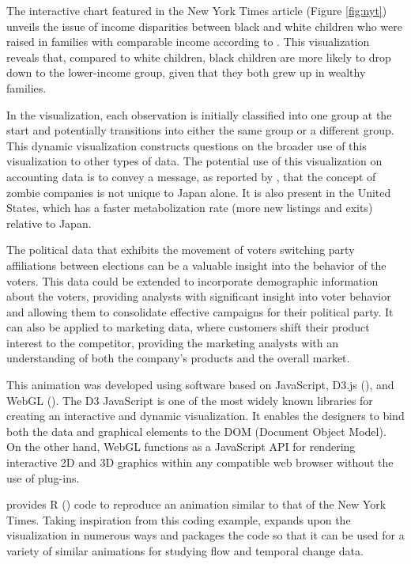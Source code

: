 The interactive chart featured in the New York Times article (Figure \ref{fig:nyt}) unveils the issue of income disparities between black and white children who were raised in families with comparable income according to \citet{race}. This visualization reveals that, compared to white children, black children are more likely to drop down to the lower-income group, given that they both grew up in wealthy families.

In the visualization, each observation is initially classified into one group at the start and potentially transitions into either the same group or a different group. This dynamic visualization constructs questions on the broader use of this visualization to other types of data. The potential use of this visualization on accounting data is to convey a message, as reported by \citet{oecd_report}, that the concept of zombie companies is not unique to Japan alone. It is also present in the United States, which has a faster metabolization rate (more new listings and exits) relative to Japan.

The political data that exhibits the movement of voters switching party affiliations between elections can be a valuable insight into the behavior of the voters. This data could be extended to incorporate demographic information about the voters, providing analysts with significant insight into voter behavior and allowing them to consolidate effective campaigns for their political party. It can also be applied to marketing data, where customers shift their product interest to the competitor, providing the marketing analysts with an understanding of both the company's products and the overall market.

This animation was developed using software based on JavaScript, D3.js (\citet{d3js}), and WebGL (\citet{webgl}). The D3 JavaScript is one of the most widely known libraries for creating an interactive and dynamic visualization. It enables the designers to bind both the data and graphical elements to the DOM (Document Object Model). On the other hand, WebGL functions as a JavaScript API for rendering interactive 2D and 3D graphics within any compatible web browser without the use of plug-ins.

\citet{Hvitfeldt_2018} provides R (\citet{r}) code to reproduce an animation similar to that of the New York Times. Taking inspiration from this coding example,  expands upon the visualization in numerous ways and packages the code so that it can be used for a variety of similar animations for studying flow and temporal change data.

